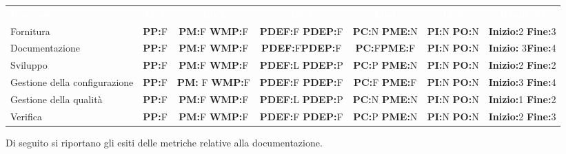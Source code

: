 \begin{table} [H]
	\begin{center}
		\begin{tabular}{|C{3cm}|c|c|c|c|c|c|}
			\textcolor{white}{\textbf{Processo}}&
			\textcolor{white}{\textbf{Liv1}}&
			\textcolor{white}{\textbf{Liv2}}&
			\textcolor{white}{\textbf{Liv3}}&
			\textcolor{white}{\textbf{Liv4}}&
			\textcolor{white}{\textbf{Liv5}}&
			\textcolor{white}{\textbf{Risultato}}\\
				
			Fornitura & \textbf{PP:}F & \textbf{PM:}F \textbf{WMP:}F & \textbf{PDEF:}F \textbf{PDEP:}F & \textbf{PC:}N \textbf{PME:}N &
			\textbf{PI:}N \textbf{PO:}N & \textbf{Inizio:}2 \textbf{Fine:}3 \\ \hline
			
			Documentazione & \textbf{PP:}F & \textbf{PM:}F \textbf{WMP:}F & \textbf{PDEF:}F\textbf{PDEP:}F & \textbf{PC:}F\textbf{PME:}F&
			\textbf{PI:}N \textbf{PO:}N & \textbf{Inizio:} 3\textbf{Fine:}4 \\ \hline
			
			Sviluppo & \textbf{PP:}F & \textbf{PM:}F \textbf{WMP:}F& \textbf{PDEF:}L \textbf{PDEP:}P & \textbf{PC:}P \textbf{PME:}N &
			\textbf{PI:}N \textbf{PO:}N & \textbf{Inizio:}2 \textbf{Fine:}2 \\ \hline
			
			Gestione della configurazione & \textbf{PP:}F & \textbf{PM:} F \textbf{WMP:}F & \textbf{PDEF:}F \textbf{PDEP:}F & \textbf{PC:}F \textbf{PME:}F &
			\textbf{PI:}N \textbf{PO:}N & \textbf{Inizio:}3 \textbf{Fine:}4 \\ \hline
			
			Gestione della qualità & \textbf{PP:}F & \textbf{PM:}F \textbf{WMP:}F & \textbf{PDEF:}L \textbf{PDEP:}P & \textbf{PC:}N \textbf{PME:}N &
			\textbf{PI:}N \textbf{PO:}N & \textbf{Inizio:}1 \textbf{Fine:}2 \\ \hline
			
			Verifica & \textbf{PP:}F & \textbf{PM:}F \textbf{WMP:}F & \textbf{PDEF:}F \textbf{PDEP:}F & \textbf{PC:}P \textbf{PME:}N &
			\textbf{PI:}N \textbf{PO:}N & \textbf{Inizio:}2 \textbf{Fine:}3 \\ \hline	
		\end{tabular}
	\end{center}
\end{table}
Di seguito si riportano gli esiti delle metriche relative alla documentazione.
